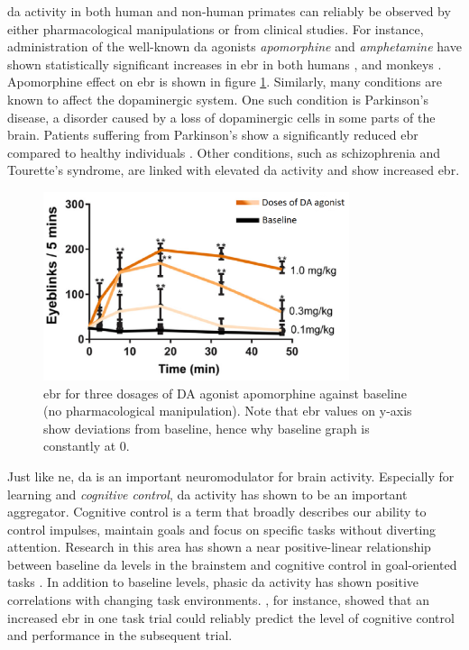 \acrshort{da} activity in both human and non-human primates can reliably be observed by either pharmacological manipulations or from clinical studies. For instance, administration of the well-known \acrshort{da} agonists \textit{apomorphine} and \textit{amphetamine} have shown statistically significant increases in \acrshort{ebr} in both humans \cite{blin1990, strakowski1998, strakowski1996}, and monkeys \cite{redmond2011, kotani2016}. Apomorphine effect on \acrshort{ebr} is shown in figure \ref{fig:bt/da_corr}. Similarly, many conditions are known to affect the dopaminergic system. One such condition is Parkinson's disease, a disorder caused by a loss of dopaminergic cells in some parts of the brain. Patients suffering from Parkinson's show a significantly reduced \acrshort{ebr} compared to healthy individuals \cite{bologna2012}. Other conditions, such as schizophrenia and Tourette's syndrome, are linked with elevated \acrshort{da} activity and show increased \acrshort{ebr}. 

\begin{figure}[h]
    \centering
    \includegraphics[width=0.8\textwidth]{figures/bt_DA_correlation.png}
    \caption{\acrlong{ebr} for three dosages of DA agonist apomorphine against baseline (no pharmacological manipulation). Note that \acrshort{ebr} values on y-axis show deviations from baseline, hence why baseline graph is constantly at 0.}
    \label{fig:bt/da_corr}
\end{figure}

Just like \acrshort{ne}, \acrshort{da} is an important neuromodulator for brain activity. Especially for learning and \textit{cognitive control}, \acrshort{da} activity has shown to be an important aggregator. Cognitive control is a term that broadly describes our ability to control impulses, maintain goals and focus on specific tasks without diverting attention. Research in this area has shown a near positive-linear relationship between baseline \acrshort{da} levels in the brainstem and cognitive control in goal-oriented tasks \cite{puig2014, westbrook2016}. In addition to baseline levels, phasic \acrshort{da} activity has shown positive correlations with changing task environments. \textcite{bochove2012}, for instance, showed that an increased \acrshort{ebr} in one task trial could reliably predict the level of cognitive control and performance in the subsequent trial.

